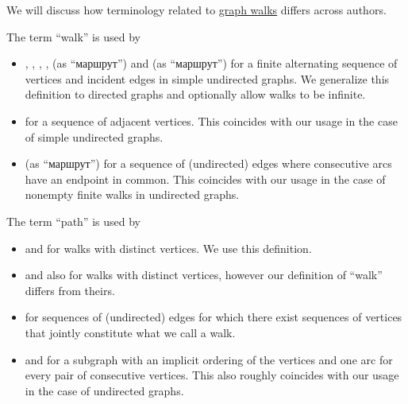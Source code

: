 \begin{remark}\label{rem:graph_walk_terminology}
  We will discuss how terminology related to \hyperref[def:graph_walk]{graph walks} differs across authors.

  \begin{thmenum}
     The term \enquote{walk} is used by
    \begin{itemize}
      \item {}, , , ,  (as \enquote{маршрут}) and  (as \enquote{маршрут}) for a finite alternating sequence of vertices and incident edges in simple undirected graphs. We generalize this definition to directed graphs and optionally allow walks to be infinite.

      \item {} for a sequence of adjacent vertices. This coincides with our usage in the case of simple undirected graphs.

      \item {} (as \enquote{маршрут}) for a sequence of (undirected) edges where consecutive arcs have an endpoint in common. This coincides with our usage in the case of nonempty finite walks in undirected graphs.
    \end{itemize}

     The term \enquote{path} is used by
    \begin{itemize}
      \item {} and  for walks with distinct vertices. We use this definition.

      \item {} and  also for walks with distinct vertices, however our definition of \enquote{walk} differs from theirs.

      \item {} for sequences of (undirected) edges for which there exist sequences of vertices that jointly constitute what we call a walk.

      \item {} and  for a subgraph with an implicit ordering of the vertices and one arc for every pair of consecutive vertices. This also roughly coincides with our usage in the case of undirected graphs.


\end{itemize}
\end{thmenum}
\end{remark}
